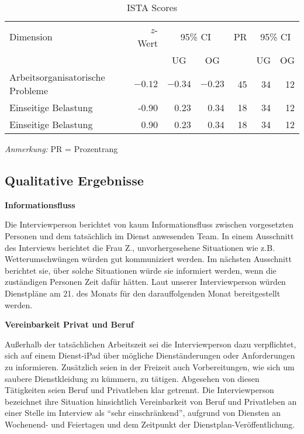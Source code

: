 \documentclass[12pt, a4paper]{article}
\begin{document}
\begin{table}[h]
    \centering
    \begin{threeparttable}
    \caption{ISTA Scores}
    \begin{tabular}{lrrrrrr}
        \toprule
        Dimension & {$z$-Wert} & \multicolumn{2}{c}{95\% CI}  & PR & \multicolumn{2}{c}{95\% CI} \\
        \cmidrule(lr){3-4} \cmidrule(lr){6-7}
         & & \multicolumn{1}{c}{UG}  & \multicolumn{1}{c}{OG} & & \multicolumn{1}{c}{UG} & \multicolumn{1}{c}{OG} \\
        \midrule
        Arbeitsorganisatorische Probleme & $-0.12$ & $-0.34$ & $-0.23$ & 45 & 34 & 12\\
        Einseitige Belastung & -0.90 & 0.23 & 0.34 & 18 & 34 & 12 \\
        Einseitige Belastung & 0.90 & 0.23 & 0.34 & 18 & 34 & 12 \\
        \bottomrule
    \end{tabular}
    \begin{tablenotes}[flushleft]
        \small
        \item \textit{Anmerkung:} PR = Prozentrang
    \end{tablenotes}
    \end{threeparttable}
\end{table}

\subsection{Qualitative Ergebnisse}

\textbf{Informationsfluss}

Die Interviewperson berichtet von kaum Informationsfluss zwischen vorgesetzten Personen und dem tatsächlich im Dienst anwesenden Team. 
In einem Ausschnitt des Interviews berichtet die Frau Z., unvorhergesehene Situationen wie z.B. Wetterumschwüngen würden gut kommuniziert werden.
Im nächsten Ausschnitt berichtet sie, über solche Situationen würde sie informiert werden, wenn die zuständigen Personen Zeit dafür hätten.
Laut unserer Interviewperson würden Dienstpläne am 21. des Monats für den darauffolgenden Monat bereitgestellt werden.

\textbf{Vereinbarkeit Privat und Beruf}

Außerhalb der tatsächlichen Arbeitszeit sei die Interviewperson dazu verpflichtet, sich auf einem Dienst-iPad über mögliche Dienständerungen
oder Anforderungen zu informieren. Zusätzlich seien in der Freizeit auch Vorbereitungen, wie sich um saubere Dienstkleidung zu kümmern, zu tätigen.
Abgesehen von diesen Tätigkeiten seien Beruf und Privatleben klar getrennt.
Die Interviewperson bezeichnet ihre Situation hinsichtlich Vereinbarkeit von Beruf 
und Privatleben an einer Stelle im Interview als “sehr einschränkend”, aufgrund von Diensten an Wochenend- und Feiertagen 
und dem Zeitpunkt der Dienstplan-Veröffentlichung.
\end{document}

